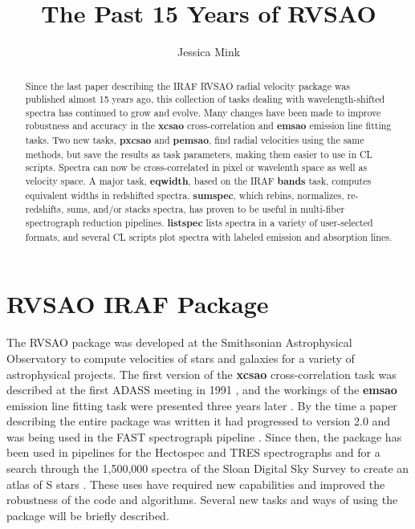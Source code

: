 
\resetcounters




\title{The Past 15 Years of RVSAO}
\author{Jessica Mink}


\begin{abstract}
Since the last paper describing the IRAF RVSAO radial velocity package was published almost 15 years ago, this collection of tasks dealing with wavelength-shifted spectra has continued to grow and evolve. Many changes have been made to improve robustness and accuracy in the \textbf{xcsao} cross-correlation and \textbf{emsao} emission line fitting tasks. Two new tasks, \textbf{pxcsao} and \textbf{pemsao}, find radial velocities using the same methods, but save the results as task parameters, making them easier to use in CL scripts.  Spectra can now be cross-correlated in pixel or wavelenth space as well as velocity space.  A major task, \textbf{eqwidth}, based on the IRAF \textbf{bands} task, computes equivalent widths in redshifted spectra. \textbf{sumspec}, which rebins, normalizes, re-redshifts, sums, and/or stacks spectra, has proven to be useful in multi-fiber spectrograph reduction pipelines.  \textbf{listspec} lists spectra in a variety of user-selected formats, and several CL scripts plot spectra with labeled emission and absorption lines. 

\end{abstract}

\section{RVSAO IRAF Package}

The RVSAO package was developed at the Smithsonian Astrophysical Observatory to compute velocities of stars and galaxies for a variety of astrophysical projects.  The first version of the \textbf{xcsao} cross-correlation task was described at the first ADASS meeting in 1991 \citep{xcsao_1991}, and the workings of the \textbf{emsao} emission line fitting task were presented three years later \citep{1995ASPC...77..496M}. By the time a paper describing the entire package was written \citep{1998PASP..110..934K} it had progressed to version 2.0 and was being used in the FAST spectrograph pipeline \citep{1997ASPC..125..140T}.  Since then, the package has been used in pipelines for the Hectospec \citep{2007ASPC..376..249M} and TRES \citep{2011ASPC..442..305M} spectrographs and for a search through the 1,500,000 spectra of the Sloan Digital Sky Survey to create an atlas of S stars \citep{2011AAS...21715303O}.  These uses have required new capabilities and improved the robustness of the code and algorithms.  Several new tasks and ways of using the package will be briefly described.


